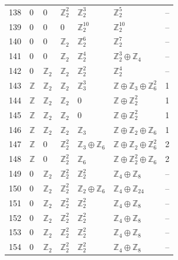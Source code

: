 \documentclass[10pt]{article}
\begin{document}
\begin{longtable}{rlllllr}
138 & $0$ & $0$ & $\mathbb{Z}_{2}^{2}$ & $\mathbb{Z}_{2}^{3}$ & $\mathbb{Z}_{2}^{5}$ & -- \\
139 & $0$ & $0$ & $0$ & $\mathbb{Z}_{2}^{10}$ & $\mathbb{Z}_{2}^{10}$ & -- \\
140 & $0$ & $0$ & $\mathbb{Z}_{2}$ & $\mathbb{Z}_{2}^{6}$ & $\mathbb{Z}_{2}^{7}$ & -- \\
141 & $0$ & $0$ & $\mathbb{Z}_{2}$ & $\mathbb{Z}_{2}^{4}$ & $\mathbb{Z}_{2}^{3}\oplus \mathbb{Z}_{4}$ & -- \\
142 & $0$ & $\mathbb{Z}_{2}$ & $\mathbb{Z}_{2}$ & $\mathbb{Z}_{2}^{2}$ & $\mathbb{Z}_{2}^{4}$ & -- \\
143 & $\mathbb{Z}$ & $\mathbb{Z}_{2}$ & $\mathbb{Z}_{2}$ & $\mathbb{Z}_{3}^{3}$ & $\mathbb{Z}\oplus \mathbb{Z}_{3}\oplus \mathbb{Z}_{6}^{2}$ & 1 \\
144 & $\mathbb{Z}$ & $\mathbb{Z}_{2}$ & $\mathbb{Z}_{2}$ & $0$ & $\mathbb{Z}\oplus \mathbb{Z}_{2}^{2}$ & 1 \\
145 & $\mathbb{Z}$ & $\mathbb{Z}_{2}$ & $\mathbb{Z}_{2}$ & $0$ & $\mathbb{Z}\oplus \mathbb{Z}_{2}^{2}$ & 1 \\
146 & $\mathbb{Z}$ & $\mathbb{Z}_{2}$ & $\mathbb{Z}_{2}$ & $\mathbb{Z}_{3}$ & $\mathbb{Z}\oplus \mathbb{Z}_{2}\oplus \mathbb{Z}_{6}$ & 1 \\
147 & $\mathbb{Z}$ & $0$ & $\mathbb{Z}_{2}^{2}$ & $\mathbb{Z}_{3}\oplus \mathbb{Z}_{6}$ & $\mathbb{Z}\oplus \mathbb{Z}_{2}\oplus \mathbb{Z}_{6}^{2}$ & 2 \\
148 & $\mathbb{Z}$ & $0$ & $\mathbb{Z}_{2}^{2}$ & $\mathbb{Z}_{6}$ & $\mathbb{Z}\oplus \mathbb{Z}_{2}^{2}\oplus \mathbb{Z}_{6}$ & 2 \\
149 & $0$ & $\mathbb{Z}_{2}$ & $\mathbb{Z}_{2}^{2}$ & $\mathbb{Z}_{2}^{2}$ & $\mathbb{Z}_{4}\oplus \mathbb{Z}_{8}$ & -- \\
150 & $0$ & $\mathbb{Z}_{2}$ & $\mathbb{Z}_{2}^{2}$ & $\mathbb{Z}_{2}\oplus \mathbb{Z}_{6}$ & $\mathbb{Z}_{4}\oplus \mathbb{Z}_{24}$ & -- \\
151 & $0$ & $\mathbb{Z}_{2}$ & $\mathbb{Z}_{2}^{2}$ & $\mathbb{Z}_{2}^{2}$ & $\mathbb{Z}_{4}\oplus \mathbb{Z}_{8}$ & -- \\
152 & $0$ & $\mathbb{Z}_{2}$ & $\mathbb{Z}_{2}^{2}$ & $\mathbb{Z}_{2}^{2}$ & $\mathbb{Z}_{4}\oplus \mathbb{Z}_{8}$ & -- \\
153 & $0$ & $\mathbb{Z}_{2}$ & $\mathbb{Z}_{2}^{2}$ & $\mathbb{Z}_{2}^{2}$ & $\mathbb{Z}_{4}\oplus \mathbb{Z}_{8}$ & -- \\
154 & $0$ & $\mathbb{Z}_{2}$ & $\mathbb{Z}_{2}^{2}$ & $\mathbb{Z}_{2}^{2}$ & $\mathbb{Z}_{4}\oplus \mathbb{Z}_{8}$ & -- \\

\end{longtable}
\end{document}
